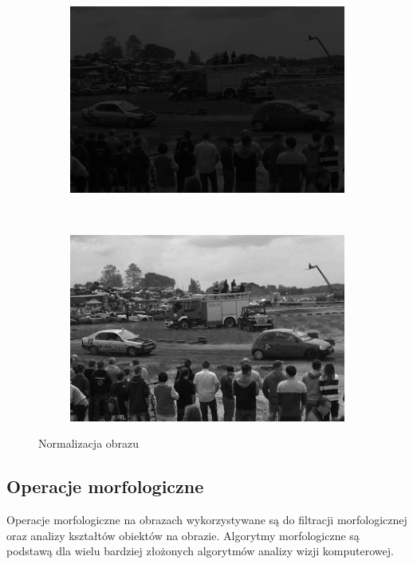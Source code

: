 \begin{figure}
  \centering
  \begin{subfigure}[b]{0.45\textwidth}
    \includegraphics[width=\textwidth]{img/image-normalize-before}
    \label{fig:image_normalize_before}
  \end{subfigure}
  ~
  \begin{subfigure}[b]{0.45\textwidth}
    \includegraphics[width=\textwidth]{img/image-normalize-after}
    \label{fig:image_normalize_after}
  \end{subfigure}
  \caption{Normalizacja obrazu}
  \label{fig:image_normalize}
\end{figure}
\subsection{Operacje morfologiczne}
Operacje morfologiczne na obrazach wykorzystywane są do filtracji morfologicznej oraz analizy kształtów obiektów na obrazie. Algorytmy morfologiczne są podstawą dla wielu bardziej złożonych algorytmów analizy wizji komputerowej.
